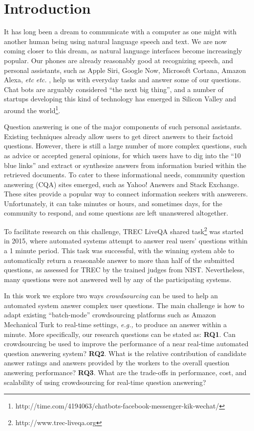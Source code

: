 \documentclass[letterpaper]{article}
\makeatletter
\newcommand{\eg}{\textit{e.g.,}\@\xspace}
\newcommand{\etc}{%
    \@ifnextchar{.}%
        {\textit{etc}}%
        {\textit{etc.}\@\xspace}%
}
\makeatother
\begin{document}
\section{Introduction}
\label{sec:introduction}

It has long been a dream to communicate with a computer as one might with another human being using natural language speech and text.
We are now coming closer to this dream, as natural language interfaces become increasingly popular.
Our phones are already reasonably good at recognizing speech, and personal assistants, such as Apple Siri, Google Now, Microsoft Cortana, Amazon Alexa, \etc, help us with everyday tasks and answer some of our questions.
Chat bots are arguably considered ``the next big thing'', and a number of startups developing this kind of technology has emerged in Silicon Valley and around the world\footnote{http://time.com/4194063/chatbots-facebook-messenger-kik-wechat/}.

Question answering is one of the major components of such personal assistants.
Existing techniques already allow users to get direct answers to their factoid questions.
However, there is still a large number of more complex questions, such as advice or accepted general opinions, for which users have to dig into the ``10 blue links'' and extract or synthesize answers from information buried within the retrieved documents.
To cater to these informational needs, community question answering (CQA) sites emerged, such as Yahoo! Answers and Stack Exchange.
These sites provide a popular way to connect information seekers with answerers.
Unfortunately, it can take minutes or hours, and sometimes days, for the community to respond, and some questions are left unanswered altogether. 

To facilitate research on this challenge, TREC LiveQA shared task\footnote{http://www.trec-liveqa.org} was started in 2015, where automated systems attempt to answer real users' questions within a 1 minute period.
This task was successful, with the winning system able to automatically return a reasonable answer to more than half of the submitted questions, as assessed for TREC by the trained judges from NIST.
Nevertheless, many questions were not answered well by any of the participating systems.

In this work we explore two ways \textit{crowdsourcing} can be used to help an automated system answer complex user questions.
The main challenge is how to adapt existing ``batch-mode'' crowdsourcing platforms such as Amazon Mechanical Turk to real-time settings, \eg to produce an answer within a minute.
More specifically, our research questions can be stated as:
\textbf{RQ1}. Can crowdsourcing be used to improve the performance of a near real-time automated question answering system?
\textbf{RQ2}. What is the relative contribution of candidate answer ratings and answers provided by the workers to the overall question answering performance?
\textbf{RQ3}. What are the trade-offs in performance, cost, and scalability of using crowdsourcing for real-time question answering?
\end{document}
